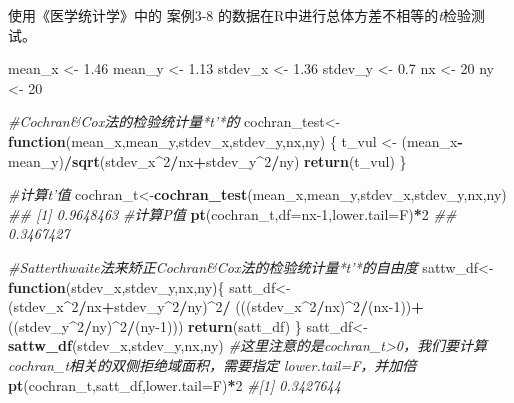 \documentclass[
]{article}
\newenvironment{Shaded}{\begin{snugshade}}{\end{snugshade}}
\newcommand{\CommentTok}[1]{\textcolor[rgb]{0.56,0.35,0.01}{\textit{#1}}}
\newcommand{\ControlFlowTok}[1]{\textcolor[rgb]{0.13,0.29,0.53}{\textbf{#1}}}
\newcommand{\DataTypeTok}[1]{\textcolor[rgb]{0.13,0.29,0.53}{#1}}
\newcommand{\DecValTok}[1]{\textcolor[rgb]{0.00,0.00,0.81}{#1}}
\newcommand{\FloatTok}[1]{\textcolor[rgb]{0.00,0.00,0.81}{#1}}
\newcommand{\KeywordTok}[1]{\textcolor[rgb]{0.13,0.29,0.53}{\textbf{#1}}}
\newcommand{\NormalTok}[1]{#1}
\newcommand{\OperatorTok}[1]{\textcolor[rgb]{0.81,0.36,0.00}{\textbf{#1}}}
\newcommand{\StringTok}[1]{\textcolor[rgb]{0.31,0.60,0.02}{#1}}
\begin{document}
使用《医学统计学》中的 案例3-8 的数据在R中进行总体方差不相等的\emph{t}检验测试。

\begin{Shaded}
\begin{Highlighting}[]
\NormalTok{mean_x <-}\StringTok{ }\FloatTok{1.46}
\NormalTok{mean_y <-}\StringTok{ }\FloatTok{1.13}
\NormalTok{stdev_x <-}\StringTok{ }\FloatTok{1.36}
\NormalTok{stdev_y <-}\StringTok{ }\FloatTok{0.7}
\NormalTok{nx <-}\StringTok{ }\DecValTok{20}
\NormalTok{ny <-}\StringTok{ }\DecValTok{20}

\CommentTok{#Cochran&Cox法的检验统计量*t'*的}
\NormalTok{cochran_test<-}\ControlFlowTok{function}\NormalTok{(mean_x,mean_y,stdev_x,stdev_y,nx,ny) \{}
\NormalTok{  t_vul <-}\StringTok{ }\NormalTok{(mean_x}\OperatorTok{-}\NormalTok{mean_y)}\OperatorTok{/}\KeywordTok{sqrt}\NormalTok{(stdev_x}\OperatorTok{^}\DecValTok{2}\OperatorTok{/}\NormalTok{nx}\OperatorTok{+}\NormalTok{stdev_y}\OperatorTok{^}\DecValTok{2}\OperatorTok{/}\NormalTok{ny)}
  \KeywordTok{return}\NormalTok{(t_vul)}
\NormalTok{\}}

\CommentTok{#计算t'值}
\NormalTok{cochran_t<-}\KeywordTok{cochran_test}\NormalTok{(mean_x,mean_y,stdev_x,stdev_y,nx,ny)}
\CommentTok{## [1] 0.9648463}
\CommentTok{#计算P值}
\KeywordTok{pt}\NormalTok{(cochran_t,}\DataTypeTok{df=}\NormalTok{nx}\DecValTok{-1}\NormalTok{,}\DataTypeTok{lower.tail=}\NormalTok{F)}\OperatorTok{*}\DecValTok{2}
\CommentTok{## 0.3467427}

\CommentTok{#Satterthwaite法来矫正Cochran&Cox法的检验统计量*t'*的自由度}
\NormalTok{sattw_df<-}\ControlFlowTok{function}\NormalTok{(stdev_x,stdev_y,nx,ny)\{}
\NormalTok{  satt_df<-(stdev_x}\OperatorTok{^}\DecValTok{2}\OperatorTok{/}\NormalTok{nx}\OperatorTok{+}\NormalTok{stdev_y}\OperatorTok{^}\DecValTok{2}\OperatorTok{/}\NormalTok{ny)}\OperatorTok{^}\DecValTok{2}\OperatorTok{/}
\StringTok{  }\NormalTok{(((stdev_x}\OperatorTok{^}\DecValTok{2}\OperatorTok{/}\NormalTok{nx)}\OperatorTok{^}\DecValTok{2}\OperatorTok{/}\NormalTok{(nx}\DecValTok{-1}\NormalTok{))}\OperatorTok{+}
\StringTok{  }\NormalTok{((stdev_y}\OperatorTok{^}\DecValTok{2}\OperatorTok{/}\NormalTok{ny)}\OperatorTok{^}\DecValTok{2}\OperatorTok{/}\NormalTok{(ny}\DecValTok{-1}\NormalTok{)))}
  \KeywordTok{return}\NormalTok{(satt_df)}
\NormalTok{\}}
\NormalTok{satt_df<-}\KeywordTok{sattw_df}\NormalTok{(stdev_x,stdev_y,nx,ny)}
\CommentTok{#这里注意的是cochran_t>0，我们要计算cochran_t相关的双侧拒绝域面积，需要指定 lower.tail=F，并加倍}
\KeywordTok{pt}\NormalTok{(cochran_t,satt_df,}\DataTypeTok{lower.tail=}\NormalTok{F)}\OperatorTok{*}\DecValTok{2}
\CommentTok{#[1] 0.3427644}


\end{Highlighting}
\end{Shaded}
\end{document}
